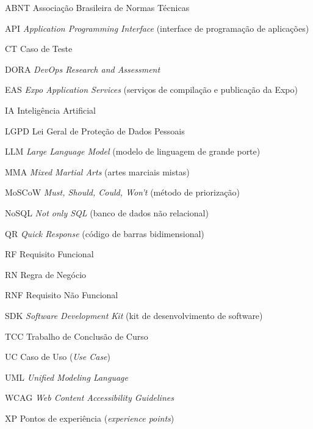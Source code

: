 \begin{siglas}
  \item[ABNT] Associação Brasileira de Normas Técnicas
  \item[API] \textit{Application Programming Interface} (interface de programação de aplicações)
  \item[CT] Caso de Teste
  \item[DORA] \textit{DevOps Research and Assessment}
  \item[EAS] \textit{Expo Application Services} (serviços de compilação e publicação da Expo)
  \item[IA] Inteligência Artificial
  \item[LGPD] Lei Geral de Proteção de Dados Pessoais
  \item[LLM] \textit{Large Language Model} (modelo de linguagem de grande porte)
  \item[MMA] \textit{Mixed Martial Arts} (artes marciais mistas)
  \item[MoSCoW] \textit{Must, Should, Could, Won't} (método de priorização)
  \item[NoSQL] \textit{Not only SQL} (banco de dados não relacional)
  \item[QR] \textit{Quick Response} (código de barras bidimensional)
  \item[RF] Requisito Funcional
  \item[RN] Regra de Negócio
  \item[RNF] Requisito Não Funcional
  \item[SDK] \textit{Software Development Kit} (kit de desenvolvimento de software)
  \item[TCC] Trabalho de Conclusão de Curso
  \item[UC] Caso de Uso (\textit{Use Case})
  \item[UML] \textit{Unified Modeling Language}
  \item[WCAG] \textit{Web Content Accessibility Guidelines}
  \item[XP] Pontos de experiência (\textit{experience points})
\end{siglas}

